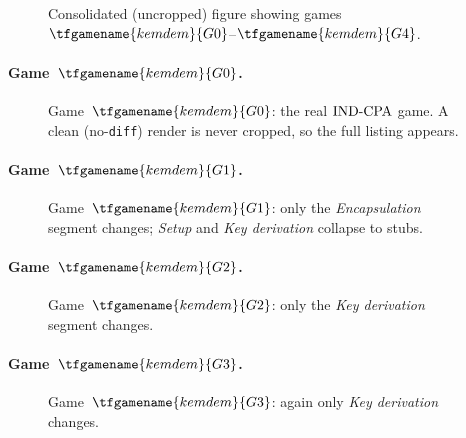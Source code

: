 \documentclass{article}
\begin{document}
\begin{figure}[ht]
\centering
{}
\caption{Consolidated (uncropped) figure showing games
$\tfgamename{kemdem}{G0}$--$\tfgamename{kemdem}{G4}$.}
\label{fig:all-games}
\end{figure}

\paragraph{Game~$\tfgamename{kemdem}{G0}$.}


\begin{figure}[ht]
\centering
{}
\caption{Game~$\tfgamename{kemdem}{G0}$: the real $\mathrm{IND\text{-}CPA}$ game. A clean
(no-\texttt{diff}) render is never cropped, so the full listing appears.}
\label{fig:G0}
\end{figure}

\paragraph{Game~$\tfgamename{kemdem}{G1}$.}


\begin{figure}[ht]
\centering
{}
\caption{Game~$\tfgamename{kemdem}{G1}$: only the \emph{Encapsulation} segment
changes; \emph{Setup} and \emph{Key derivation} collapse to stubs.}
\label{fig:G1}
\end{figure}

\paragraph{Game~$\tfgamename{kemdem}{G2}$.}


\begin{figure}[ht]
\centering
{}
\caption{Game~$\tfgamename{kemdem}{G2}$: only the \emph{Key derivation} segment
changes.}
\label{fig:G2}
\end{figure}

\paragraph{Game~$\tfgamename{kemdem}{G3}$.}


\begin{figure}[ht]
\centering
{}
\caption{Game~$\tfgamename{kemdem}{G3}$: again only \emph{Key derivation}
changes.}
\label{fig:G3}
\end{figure}
\end{document}
